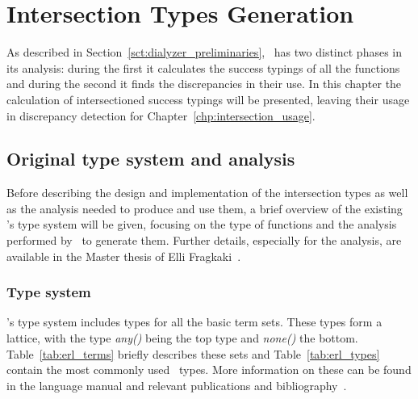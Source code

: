 \chapter{Intersection Types Generation}
\label{chp:intersection_generate}

As described in Section~\ref{sct:dialyzer_preliminaries}, \dr\ has two
distinct phases in its analysis: during the first it calculates the
success typings of all the functions and during the second it finds
the discrepancies in their use. In this chapter the calculation of
intersectioned success typings will be presented, leaving their usage
in discrepancy detection for Chapter~\ref{chp:intersection_usage}.

\section{Original type system and analysis}

Before describing the design and implementation of the intersection
types as well as the analysis needed to produce and use them, a brief
overview of the existing \er's type system will be given, focusing on
the type of functions and the analysis performed by \dr\ to generate
them. Further details, especially for the analysis, are available in
the Master thesis of Elli Fragkaki~\cite{Elli}.

\subsection{Type system}

\er's type system includes types for all the basic term sets. These
types form a lattice, with the type \emph{any()} being the top type
and \emph{none()} the bottom. Table~\ref{tab:erl_terms} briefly
describes these sets and Table~\ref{tab:erl_types} contain the most
commonly used \er\ types. More information on these can be found in
the language manual and relevant publications and
bibliography~\cite{erlman, type_system, Manolis}.

